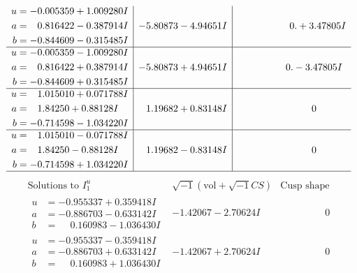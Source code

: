 \documentclass[1p]{elsarticle_modified}
\theoremstyle{definition}
\newcommand{\I}{\sqrt{-1}}
\begin{document}
$$\begin{array}{c|c|c}
\begin{aligned}
u &= -0.005359 + 1.009280 I \\
a &= \phantom{-}0.816422 - 0.387914 I \\
b &= -0.844609 - 0.315485 I\end{aligned}
 & -5.80873 - 4.94651 I & \phantom{-0.000000 -}0. + 3.47805 I \\ \hline\begin{aligned}
u &= -0.005359 - 1.009280 I \\
a &= \phantom{-}0.816422 + 0.387914 I \\
b &= -0.844609 + 0.315485 I\end{aligned}
 & -5.80873 + 4.94651 I & \phantom{-0.000000 } 0. - 3.47805 I \\ \hline\begin{aligned}
u &= \phantom{-}1.015010 + 0.071788 I \\
a &= \phantom{-}1.84250 + 0.88128 I \\
b &= -0.714598 - 1.034220 I\end{aligned}
 & \phantom{-}1.19682 + 0.83148 I & \phantom{-0.000000 } 0 \\ \hline\begin{aligned}
u &= \phantom{-}1.015010 - 0.071788 I \\
a &= \phantom{-}1.84250 - 0.88128 I \\
b &= -0.714598 + 1.034220 I\end{aligned}
 & \phantom{-}1.19682 - 0.83148 I & \phantom{-0.000000 } 0\\
 \hline 
 \end{array}$$\newpage$$\begin{array}{c|c|c}  
\text{Solutions to }I^u_{1}& \I (\text{vol} + \sqrt{-1}CS) & \text{Cusp shape}\\
 \hline 
\begin{aligned}
u &= -0.955337 + 0.359418 I \\
a &= -0.886703 - 0.633142 I \\
b &= \phantom{-}0.160983 - 1.036430 I\end{aligned}
 & -1.42067 - 2.70624 I & \phantom{-0.000000 } 0 \\ \hline\begin{aligned}
u &= -0.955337 - 0.359418 I \\
a &= -0.886703 + 0.633142 I \\
b &= \phantom{-}0.160983 + 1.036430 I\end{aligned}
 & -1.42067 + 2.70624 I & \phantom{-0.000000 } 0 \\ \hline\begin{aligned}

\end{aligned}
\end{array}$$
\end{document}
